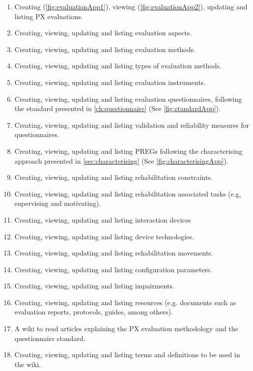 \begin{enumerate}
    \item Creating (\autoref{fig:evaluationApp1}), viewing (\autoref{fig:evaluationApp2}), updating and listing \ac{PX} evaluations.
    \item Creating, viewing, updating and listing evaluation aspects.
    \item Creating, viewing, updating and listing evaluation methods.
    \item Creating, viewing, updating and listing types of evaluation methods.
    \item Creating, viewing, updating and listing evaluation instruments.
    \item Creating, viewing, updating and listing evaluation questionnaires, following the standard presented in \autoref{ch:questionnaire} (See \autoref{fig:standardApp}).
    \item Creating, viewing, updating and listing validation and reliability measures for questionnaires.
    \item Creating, viewing, updating and listing \acp{PREG} following the characterising approach presented in \autoref{sec:characterising} (See \autoref{fig:characterisingApp}).
    \item Creating, viewing, updating and listing rehabilitation constraints.
    \item Creating, viewing, updating and listing rehabilitation associated tasks (e.g, supervising and motivating).
    \item Creating, viewing, updating and listing interaction devices
    \item Creating, viewing, updating and listing device technologies.
    \item Creating, viewing, updating and listing rehabilitation movements.
    \item Creating, viewing, updating and listing configuration parameters.
    \item Creating, viewing, updating and listing impairments.
    \item Creating, viewing, updating and listing resources (e.g. documents such as evaluation reports, protocols, guides, among others).
    \item A wiki to read articles explaining the \ac{PX} evaluation methodology and the questionnaire standard.
    \item Creating, viewing, updating and listing terms and definitions to be used in the wiki.
\end{enumerate}

